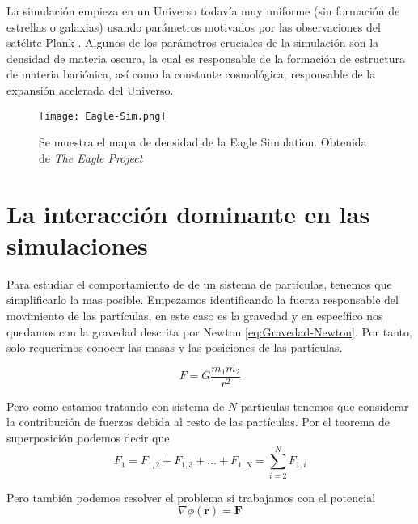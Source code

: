 La simulación empieza en un Universo todavía muy uniforme (sin formación de estrellas o galaxias) usando parámetros motivados por las observaciones del satélite Plank \cite{ 2013ApJS..208...20B, 2020A&A...641A...1P}. Algunos de los parámetros cruciales de la simulación son la densidad de materia oscura, la cual es responsable de la formación de estructura de materia bariónica, así como la constante cosmológica, responsable de la expansión acelerada del Universo.
       
\begin{figure}[H]
    \centering
    \texttt{[image: Eagle-Sim.png]}
    \caption[Eagle Simulation Cosmic Web]{Se muestra el mapa de densidad de la Eagle Simulation. Obtenida de \textit{The Eagle Project} }
    \label{fig:Eagle_Sim}
\end{figure}


\section{La interacción dominante en las simulaciones}

Para estudiar el comportamiento de de un sistema de partículas, tenemos que simplificarlo la mas posible. Empezamos identificando la fuerza responsable del movimiento de las partículas, en este caso es la gravedad y en específico nos quedamos con la gravedad descrita por Newton \eqref{eq:Gravedad-Newton}. Por tanto, solo requerimos conocer las masas y las posiciones de las partículas.

\begin{equation}
    F = G \frac{m_1 m_2}{r^2}
    \label{eq:Gravedad-Newton}
\end{equation}

Pero como estamos tratando con sistema de $N$ partículas tenemos que considerar la contribución de fuerzas debida al resto de las partículas. Por el teorema de superposición podemos decir que
\begin{equation}
    F_{1} = F_{1,2} +F_{1,3} + \dots + F_{1,N} = \sum_{i=2}^{N} F_{1,i} 
    \label{eq:superposicion}
\end{equation}

Pero también podemos resolver el problema si trabajamos con el potencial
\begin{equation}
    \nabla \phi(\mathbf{r}) = \mathbf{F}
    \label{eq:potencial-gravitacional}
\end{equation}

